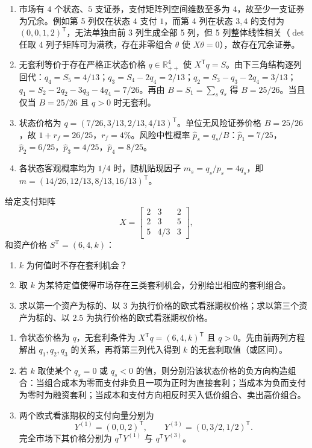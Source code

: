 \begin{solution}
\begin{enumerate}[label=(\alph*)]
\item 市场有 $4$ 个状态、$5$ 支证券，支付矩阵列空间维数至多为 $4$，故至少一支证券为冗余。例如第 5 列仅在状态 $4$ 支付 $1$，而第 4 列在状态 $3,4$ 的支付为 $(0,0,1,2)^{\mathsf T}$，无法单独由前 3 列生成全部 5 列，但 5 列整体线性相关（$\det$ 任取 4 列子矩阵可为满秩，存在非零组合 $\theta$ 使 $X\theta=0$），故存在冗余证券。
\item 无套利等价于存在严格正状态价格 $q\in\mathbb{R}^4_{++}$ 使 $X^{\mathsf T}q=S$。由下三角结构逐列回代：$q_4=S_5=4/13$；$q_3=S_4-2q_4=2/13$；$q_2=S_3-q_3-2q_4=3/13$；$q_1=S_2-2q_2-3q_3-4q_4=7/26$。再由 $B=S_1=\sum_s q_s$ 得 $B=25/26$。当且仅当 $B=25/26$ 且 $q>0$ 时无套利。
\item 状态价格为 $q=(7/26,3/13,2/13,4/13)^{\mathsf T}$。单位无风险证券价格 $B=25/26$，故 $1+r_f=26/25$，$r_f=4\%$。风险中性概率 $\widehat p_s=q_s/B$：$\widehat p_1=7/25$，$\widehat p_2=6/25$，$\widehat p_3=4/25$，$\widehat p_4=8/25$。
\item 各状态客观概率均为 $1/4$ 时，随机贴现因子 $m_s=q_s/p_s=4q_s$，即 $m=(14/26,12/13,8/13,16/13)^{\mathsf T}$。
\end{enumerate}
\end{solution}
\begin{problem}
 给定支付矩阵
\[
    X=\begin{bmatrix}
        2 & 3 & 2\\
        2 & 3 & 5\\
        5 & 4/3 & 3
    \end{bmatrix},
\]
和资产价格 $S^{\mathrm{T}}=(6,4,k)$：
\begin{enumerate}[label=(\alph*)]
    \item $k$ 为何值时不存在套利机会？
    \item 取 $k$ 为某特定值使得市场存在三类套利机会，分别给出相应的套利组合。
    \item 求以第一个资产为标的、以 $3$ 为执行价格的欧式看涨期权价格；求以第三个资产为标的、以 $2.5$ 为执行价格的欧式看涨期权价格。
\end{enumerate}
\end{problem}
\begin{solution}
\begin{enumerate}[label=(\alph*)]
\item 令状态价格为 $q$，无套利条件为 $X^{\mathsf T}q=(6,4,k)^{\mathsf T}$ 且 $q>0$。先由前两列方程解出 $q_1,q_2,q_3$ 的关系，再将第三列代入得到 $k$ 的无套利取值（或区间）。
\item 若 $k$ 取使某个 $q_s=0$ 或 $q_s<0$ 的值，则分别沿该状态价格的负方向构造组合：当组合成本为零而支付非负且一项为正时为直接套利；当成本为负而支付为零时为融资套利；当成本和支付方向相反时买入低价组合、卖出高价组合。
\item 两个欧式看涨期权的支付向量分别为
\[
Y^{(1)}=(0,0,2)^{\mathsf T},\qquad Y^{(3)}=(0,3/2,1/2)^{\mathsf T}.
\]
完全市场下其价格分别为 $q^{\mathsf T}Y^{(1)}$ 与 $q^{\mathsf T}Y^{(3)}$。
\end{enumerate}
\end{solution}
